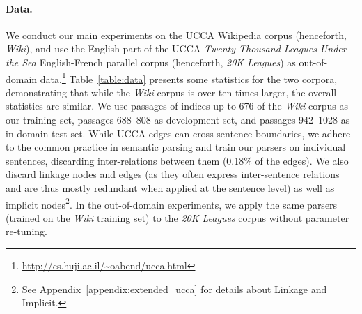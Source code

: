 \documentclass[11pt,a4paper]{article}
\newcommand{\tabref}[1]{Table~\ref{#1}}
\begin{document}
\paragraph{Data.}
We conduct our main experiments on the UCCA Wikipedia corpus (henceforth, \textit{Wiki}),
and use the English part of the UCCA \textit{Twenty Thousand Leagues Under the Sea}
English-French parallel corpus (henceforth, \textit{20K Leagues}) as
out-of-domain data.\footnote{\mbox{\url{http://cs.huji.ac.il/~oabend/ucca.html}}}
\tabref{table:data} presents some statistics for the two corpora, demonstrating that while
the \textit{Wiki} corpus is over ten times larger, the overall statistics are
similar.
We use passages of indices up to 676
of the \textit{Wiki} corpus as our training set, passages 688--808 as development set,
and passages 942--1028 as in-domain test set.
While UCCA edges can cross sentence boundaries, we adhere to the common
practice in semantic parsing and train our parsers on individual sentences,
discarding inter-relations between them (0.18\% of the edges).
We also discard linkage nodes and edges (as they often express inter-sentence
relations and are thus mostly redundant when applied at the sentence level)
as well as implicit nodes\footnote{See Appendix~\ref{appendix:extended_ucca}
for details about Linkage and Implicit.}.
In the out-of-domain experiments, we apply the same parsers
(trained on the \textit{Wiki} training set) to the \textit{20K Leagues} corpus
without parameter re-tuning.


\begin{table}
\caption{Statistics of the \textit{Wiki} and \textit{20K Leagues} UCCA corpora.
All counts exclude the root node, implicit nodes, and linkage nodes and edges.
}
\label{table:data}
\end{table}
\end{document}
